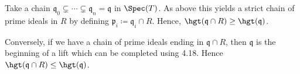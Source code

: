 Take a chain $\mathfrak{q}_0 \subsetneq \cdots \subsetneq \mathfrak{q}_n = \mathfrak{q}$
in $\Spec(T)$. As above this yields a strict chain of prime ideals in $R$
by defining $\mathfrak{p}_i\coloneqq \mathfrak{q}_i\cap R$. Hence,
$\hgt(\mathfrak{q}\cap R) \geq \hgt(\mathfrak{q})$.

Conversely, if we have a chain of prime ideals ending in $\mathfrak{q}\cap R$,
then $\mathfrak{q}$ is the beginning of a lift which can be completed using
4.18. Hence $\hgt(\mathfrak{q}\cap R)\leq \hgt(\mathfrak{q})$.
